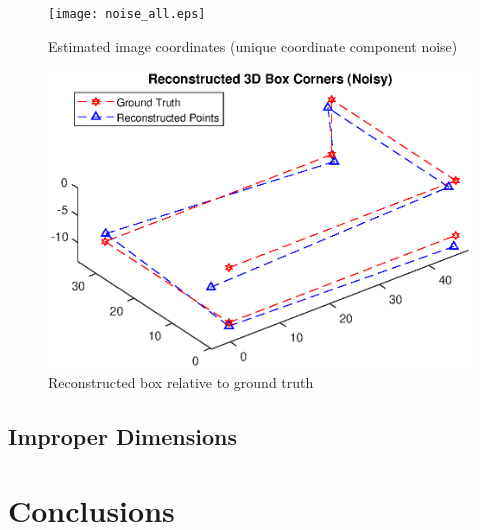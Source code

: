 \documentclass[12pt]{article}
\begin{document}
	\begin{figure}[h]
	\centering %
	\captionsetup{justification=centering}
	\begin{minipage}{0.5\textwidth}
		\centering
		\texttt{[image: noise\_all.eps]}
		\caption{Estimated image coordinates \newline(unique coordinate component noise)} \label{noiseall}
	\end{minipage}\hfill
	\begin{minipage}{0.5\textwidth}
		\centering %
		\includegraphics[width=1\textwidth]{noise_all_recon.eps}
		\caption{Reconstructed box relative to ground truth} \label{noiseallrecon}
	\end{minipage}
\end{figure}

\subsection{Improper Dimensions}



\section{Conclusions}
\end{document}
